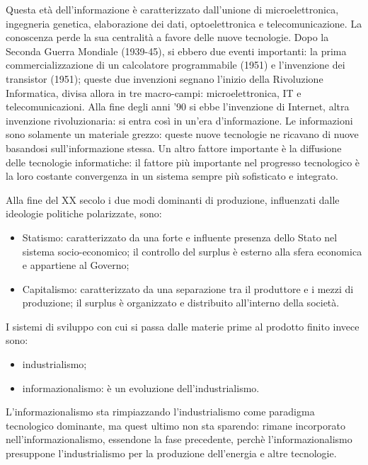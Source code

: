 \documentclass[a4page, 11pt]{article}
\begin{document}
Questa età dell'informazione è caratterizzato dall'unione di microelettronica, ingegneria genetica, elaborazione dei dati, optoelettronica e telecomunicazione.
La conoscenza perde la sua centralità a favore delle nuove tecnologie.
Dopo la Seconda Guerra Mondiale (1939-45), si ebbero due eventi importanti: la prima commercializzazione di un calcolatore programmabile (1951) e l'invenzione dei transistor (1951); queste due invenzioni segnano l'inizio della Rivoluzione Informatica, divisa allora in tre macro-campi: microelettronica, IT e telecomunicazioni.
Alla fine degli anni '90 si ebbe l'invenzione di Internet, altra invenzione rivoluzionaria: si entra così in un'era d'informazione.
Le informazioni sono solamente un materiale grezzo: queste nuove tecnologie ne ricavano di nuove basandosi sull'informazione stessa.
Un altro fattore importante è la diffusione delle tecnologie informatiche: il fattore più importante nel progresso tecnologico è la loro costante convergenza in un sistema sempre più sofisticato e integrato.

Alla fine del XX secolo i due modi dominanti di produzione, influenzati dalle ideologie politiche polarizzate, sono:
\begin{itemize}
  \item Statismo: caratterizzato da una forte e influente presenza dello Stato nel sistema socio-economico; il controllo del surplus è esterno alla sfera economica e appartiene al Governo;
  \item Capitalismo: caratterizzato da una separazione tra il produttore e i mezzi di produzione; il surplus è organizzato e distribuito all'interno della società.
\end{itemize}
I sistemi di sviluppo con cui si passa dalle materie prime al prodotto finito invece sono:
\begin{itemize}
  \item industrialismo;
  \item informazionalismo: è un evoluzione dell'industrialismo.
\end{itemize}
L'informazionalismo sta rimpiazzando l'industrialismo come paradigma tecnologico dominante, ma quest ultimo non sta sparendo: rimane incorporato nell'informazionalismo, essendone la fase precedente, perchè l'informazionalismo presuppone l'industrialismo per la produzione dell'energia e altre tecnologie.
\end{document}
